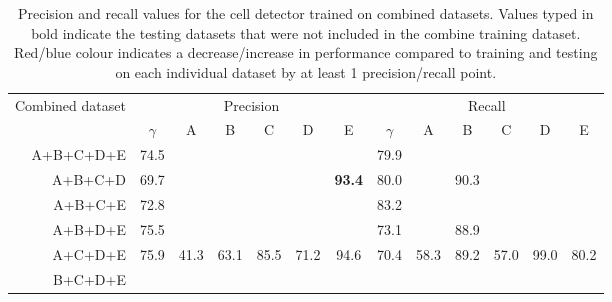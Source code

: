 		\begin{table}[h]
			\centering
			\begin{tabular}{r|*{6}{c}|*{6}{c}}
				\multicolumn{1}{c}{Combined dataset} & \multicolumn{6}{|c|}{Precision}                                                            &                                   \multicolumn{6}{c}{Recall}                                    \\
				                                     & $\gamma$ &     A     &     B     &         C          &         D          &       E       & $\gamma$ &     A     &     B     &         C          &         D          &         E          \\
			\hline
				                           A+B+C+D+E &   74.5   & \up{49.2} & \dn{76.0} &     \up{85.2}      &     \dn{69.2}      &   \up{94.5}   &   79.9   & \up{58.3} & \up{90.8} &     \dn{57.1}      &     \up{98.9}      &     \up{79.7}      \\
				                             A+B+C+D &   69.7   & \up{49.2} & \dn{77.0} &     \up{85.8}      &     \dn{69.9}      & \textbf{93.4} &   80.0   & \up{58.3} &   90.3    &     \dn{58.7}      &     \up{98.4}      & \up{\textbf{80.7}} \\
				                             A+B+C+E &   72.8   & \up{45.9} & \dn{75.0} &     \up{82.6}      & \dn{\textbf{41.1}} &   \dn{87.2}   &   83.2   & \up{65.0} & \up{96.4} &     \dn{73.6}      & \up{\textbf{99.4}} &     \up{89.8}      \\
				                             A+B+D+E &   75.5   & \up{47.5} & \dn{75.8} & \up{\textbf{85.7}} &     \dn{73.1}      &   \up{96.5}   &   73.1   & \up{50.8} &   88.9    & \dn{\textbf{46.1}} &     \up{97.1}      &     \dn{68.3}      \\
				                             A+C+D+E &   75.9   &   41.3    &   63.1    &        85.5        &        71.2        &     94.6      &   70.4   &   58.3    &   89.2    &        57.0        &        99.0        &        80.2        \\
				                             B+C+D+E &          &           &           &                    &                    &               &          &           &           &                    &                    &
			\end{tabular} 
			\caption{Precision and recall values for the cell detector trained on combined datasets. Values typed in bold indicate the testing datasets that were not included in the combine training dataset. Red/blue colour indicates a decrease/increase in performance compared to training and testing on each individual dataset by at least 1 precision/recall point.}
			\label{tab:results_detector_combined}
		\end{table}
				
